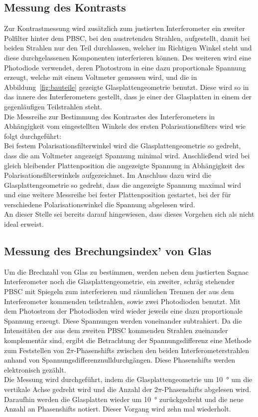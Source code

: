 \subsection{Messung des Kontrasts}
%
Zur Kontrastmessung wird zusätzlich zum justierten Interferometer 
ein zweiter Polfilter hinter dem PBSC, bei den austretenden Strahlen, 
aufgestellt, damit bei beiden Strahlen nur den Teil durchlassen, 
welcher im Richtigen Winkel steht und diese durchgelassenen 
Komponenten interferieren können. Des weiteren wird eine 
Photodiode verwendet, deren Photostrom in eine dazu proportionale 
Spannung erzeugt, welche mit einem Voltmeter gemessen wird, und 
die in Abbildung~\ref{fig:bauteile} gezeigte Glasplattengeometrie 
benutzt. Diese wird so in das innere des Interferometers gestellt, 
dass je einer der Glasplatten in einem der gegenläufigen Teilstrahlen 
steht.\\
Die Messreihe zur Bestimmung des Kontrastes des Interferometers 
in Abhängigkeit vom eingestellten Winkels des ersten 
Polarisationsfilters wird wie folgt durchgeführt:\\
Bei festem Polarisationsfilterwinkel wird die Glasplattengeometrie 
so gedreht, dass die am Voltmeter angezeigt Spannung minimal wird. 
Anschließend wird bei gleich bleibender Plattenposition die 
angezeigte Spannung in Abhängigkeit des Polarisationsfilterwinkels 
aufgezeichnet.
Im Anschluss dazu wird die Glasplattengeometrie so gedreht, dass 
die angezeigte Spannung maximal wird und eine weitere 
Messreihe bei fester Plattenposition gestartet, bei der für 
verschiedene Polarisationswinkel die Spannung abgelesen wird.\\
An dieser Stelle sei bereits darauf hingewiesen, dass dieses Vorgehen 
sich als nicht ideal erweist.
%
\subsection{Messung des Brechungsindex' von Glas}
%
Um die Brechzahl von Glas zu bestimmen, werden neben dem 
justierten Sagnac Interferometer noch die Glasplattengeometrie, 
ein zweiter, schräg stehender PBSC mit Spiegeln zum interferieren und 
räumlichen Trennen der aus dem Interferometer kommenden teilstrahlen, 
sowie zwei Photodioden benutzt. Mit dem Photostrom der 
Photodioden wird wieder jeweils eine dazu proportionale 
Spannung erzeugt. Diese Spannungen werden voneinander subtrahiert. 
Da die Intensitäten der aus dem zweiten 
PBSC kommenden Strahlen zueinander komplementär sind, ergibt die 
Betrachtung der Spannungsdifferenz eine Methode zum Feststellen von 
$2\pi$-Phasenshifts zwischen den beiden Interferometerstrahlen anhand 
von Spannungsdifferenznulldurchgängen. Diese Phasenshifts werden 
elektronisch gezählt.\\
Die Messung wird durchgeführt, indem die Glasplattengeometrie um 
\SI{10}{\degree} um die vertikale Achse gedreht wird und die Anzahl 
der $2\pi$-Phasenshifts abgelesen wird. Daraufhin werden die 
Glasplatten wieder um \SI{10}{\degree} zurückgedreht und die neue 
Anzahl an Phasenshifts notiert. Dieser Vorgang wird zehn mal 
wiederholt.
%
